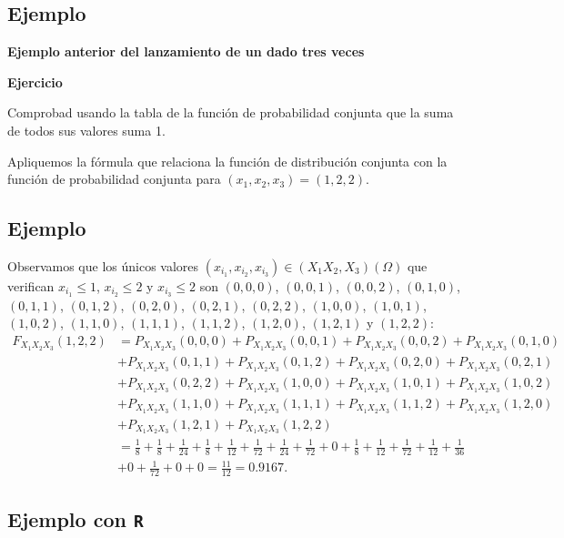 \documentclass[]{book}
\begin{document}
\hypertarget{ejemplo-89}{%
\subsection{Ejemplo}\label{ejemplo-89}}

\textbf{Ejemplo anterior del lanzamiento de un dado tres veces}

\textbf{Ejercicio}

Comprobad usando la tabla de la función de probabilidad conjunta que la suma de todos sus valores suma 1.

Apliquemos la fórmula que relaciona la función de distribución conjunta con la función de probabilidad conjunta para \((x_1,x_2,x_3)=(1,2,2)\).

\hypertarget{ejemplo-90}{%
\subsection{Ejemplo}\label{ejemplo-90}}

Observamos que los únicos valores \((x_{i_1},x_{i_2},x_{i_3})\in (X_1 X_2,X_3)(\Omega)\) que verifican \(x_{i_1}\leq 1\), \(x_{i_2}\leq 2\) y \(x_{i_3}\leq 2\) son \((0,0,0)\), \((0,0,1)\), \((0,0,2)\), \((0,1,0)\), \((0,1,1)\), \((0,1,2)\), \((0,2,0)\), \((0,2,1)\), \((0,2,2)\), \((1,0,0)\), \((1,0,1)\), \((1,0,2)\), \((1,1,0)\), \((1,1,1)\), \((1,1,2)\), \((1,2,0)\), \((1,2,1)\) y \((1,2,2)\):
\[
\begin{array}{rl}
F_{X_1X_2X_3}(1,2,2) & =P_{X_1X_2X_3}(0,0,0)+P_{X_1X_2X_3}(0,0,1)+P_{X_1X_2X_3}(0,0,2)+P_{X_1X_2X_3}(0,1,0)\\ & +P_{X_1X_2X_3}(0,1,1)+P_{X_1X_2X_3}(0,1,2)+P_{X_1X_2X_3}(0,2,0)+P_{X_1X_2X_3}(0,2,1)\\ & +P_{X_1X_2X_3}(0,2,2) +
P_{X_1X_2X_3}(1,0,0)+P_{X_1X_2X_3}(1,0,1)+P_{X_1X_2X_3}(1,0,2)\\ & +P_{X_1X_2X_3}(1,1,0)+P_{X_1X_2X_3}(1,1,1)+
P_{X_1X_2X_3}(1,1,2)+P_{X_1X_2X_3}(1,2,0)\\ & + P_{X_1X_2X_3}(1,2,1)+P_{X_1X_2X_3}(1,2,2)\\ &=
\frac{1}{8}+\frac{1}{8}+\frac{1}{24}+\frac{1}{8}+\frac{1}{12}+\frac{1}{72}+\frac{1}{24}+\frac{1}{72}+0+\frac{1}{8}+\frac{1}{12}+\frac{1}{72}+\frac{1}{12}+\frac{1}{36}\\ & +0+\frac{1}{72}+0+0=\frac{11}{12}=0.9167.
\end{array}
\]

\hypertarget{ejemplo-con-r-16}{%
\subsection{\texorpdfstring{Ejemplo con \texttt{R}}{Ejemplo con R}}\label{ejemplo-con-r-16}}
\end{document}
